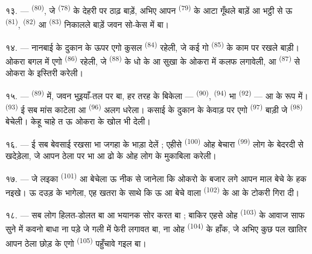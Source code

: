 १३. ---  \textsuperscript{(80)}, जे  \textsuperscript{(78)} के देहरी पर ठाढ़ बाड़ें, अभिए आपन
 \textsuperscript{(79)} के आटा गूँथले बाड़ें आ भट्ठी से ऊ
 \textsuperscript{(81)},  \textsuperscript{(82)}
आ  \textsuperscript{(83)} निकालले बाड़ें जवन सो-केस में
बा।

१४. --- नानबाई के दुकान के ऊपर एगो कुसल  \textsuperscript{(84)} रहेली, जे कई गो 
\textsuperscript{(85)} के काम पर रखले बाड़ी। ओकरा बगल में एगो
 \textsuperscript{(86)} रहेली, जे
 \textsuperscript{(88)} के धो के आ सुखा के ओकरा में कलफ
लगावेली, आ  \textsuperscript{(87)} से ओकरा के इस्तिरी
करेली।

\VUsaut{4.0mm}
\VUsaut{3.0mm}

१५. ---  \textsuperscript{(89)} में, जवन
भुइयाँ-तल पर बा, हर तरह के  बिकेला — 
\textsuperscript{(90)},  \textsuperscript{(94)} भा
 \textsuperscript{(92)} —  आ  के रूप में। 
\textsuperscript{(93)} ई सब मांस काटेला आ 
\textsuperscript{(96)} अलग धरेला। कसाई के दुकान के केवाड़ पर एगो
 \textsuperscript{(97)} बाड़ी जे 
\textsuperscript{(98)} बेचेली। केहू चाहे त ऊ ओकरा के खोल भी देली।

१६. --- ई सब बेवसाई रखसा भा जगहा के भाड़ा देलें ; एहीसे  \textsuperscript{(100)} ओह बेचारा 
\textsuperscript{(99)} लोग के बेदरदी से खदेड़ेला, जे आपन ठेला पर
 भा  आ  ढो के ओह लोग के मुकाबिला करेली।

\VUsaut{4.0mm}
\VUsaut{3.0mm}

१७. --- जे लइका  \textsuperscript{(101)} आ 
बेचेला ऊ नीक से जानेला कि ओकरो के बजार लगे आपन माल बेचे के हक नइखे। ऊ
दउड़ के भागेला, एह खतरा के साथे कि ऊ  आ
 बेचे वाला  \textsuperscript{(102)} के
 आ  के टोकरी गिरा दी।

१८. --- सब लोग हिलत-डोलत बा आ भयानक सोर करत बा ; बाकिर एहसे ओह
 \textsuperscript{(103)} के आवाज साफ सुने में कवनो बाधा
ना पड़े जे गली में फेरी लगावत बा, ना ओह 
\textsuperscript{(104)} के हाँक, जे अभिए कुछ पल खातिर आपन ठेला छोड़ के
एगो  \textsuperscript{(105)} पहुँचावे गइल बा।
